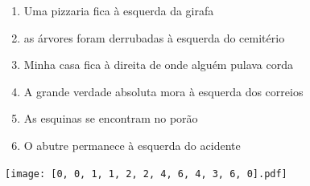 \documentclass[12pt]{article}
\begin{document}
		 

\pagebreak


	\begin{enumerate}
		  \sffamily %
		  \large %


\vfill \item
Uma pizzaria fica	%
à esquerda
da girafa	%

\vfill \item
as árvores foram derrubadas	%
à esquerda
do cemitério	%

\vfill \item
Minha casa fica	%
à direita
de onde alguém pulava corda	%

\vfill \item
A grande verdade absoluta mora	%
à esquerda
dos correios	%

\vfill \item
As esquinas se encontram	%
no porão	%

\vfill \item
O abutre permanece	%
à esquerda
do acidente	%
	\end{enumerate}
		  
		  \hfill

		  \vfill

\texttt{[image: [0, 0, 1, 1, 2, 2, 4, 6, 4, 3, 6, 0].pdf]}


	\hfill	  	  


\pagebreak			
\end{document}
